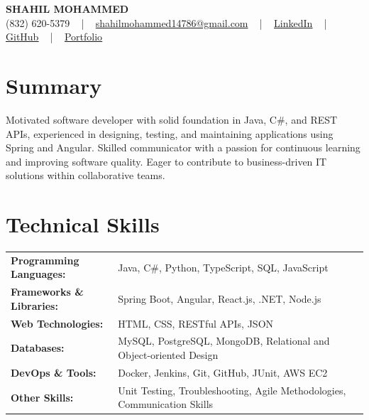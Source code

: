 \documentclass[letterpaper,11pt]{article}
\begin{document}
\begin{center}
    {\fontsize{14pt}{12pt}\selectfont \textbf{\MakeUppercase{Shahil Mohammed}}}\\ \vspace{2pt}
    \fontsize{10pt}{12pt}\selectfont (832) 620-5379 ~ | ~ \href{mailto:shahilmohammed14786@gmail.com}{shahilmohammed14786@gmail.com} ~ | ~  
    \href{https://www.linkedin.com/in/shahil-mohammed-9652931a1/}{\color{blue}\underline{LinkedIn}}  ~ | ~ 
    \href{https://github.com/freakbeast14}{\color{blue}\underline{GitHub}} ~ | ~ 
    \href{https://shahil-mohammed.netlify.app/}{\color{blue}\underline{Portfolio}}
    \vspace{-8pt}
\end{center}

\section{Summary}
\fontsize{9pt}{10pt}\selectfont
Motivated software developer with solid foundation in Java, C\#, and REST APIs, experienced in designing, testing, and maintaining applications using Spring and Angular. Skilled communicator with a passion for continuous learning and improving software quality. Eager to contribute to business-driven IT solutions within collaborative teams.
 \vspace{-5pt}
 
\section{Technical Skills}
        \vspace{-14pt}
        \begin{table}[h]
            \fontsize{9pt}{10pt}\selectfont
            \begin{tabular}{p{0.3\linewidth} p{0.7\linewidth}}
                \textbf{Programming Languages:} & Java, C\#, Python, TypeScript, SQL, JavaScript \\
                \textbf{Frameworks \& Libraries:} & Spring Boot, Angular, React.js, .NET, Node.js \\
                \textbf{Web Technologies:} & HTML, CSS, RESTful APIs, JSON \\
                \textbf{Databases:} & MySQL, PostgreSQL, MongoDB, Relational and Object-oriented Design \\
                \textbf{DevOps \& Tools:} & Docker, Jenkins, Git, GitHub, JUnit, AWS EC2 \\
                \textbf{Other Skills:} & Unit Testing, Troubleshooting, Agile Methodologies, Communication Skills \\
            \end{tabular}
        \end{table}
 \vspace{-15pt}
 
\end{document}
